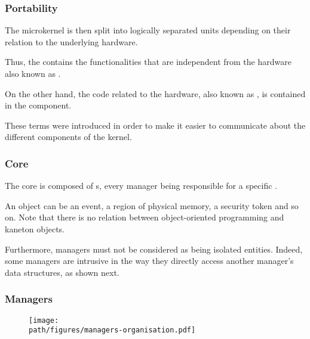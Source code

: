 
\begin{frame}
  \frametitle{Portability}

  The microkernel is then split into logically separated units depending on
  their relation to the underlying hardware.

  \-

  Thus, the  contains the functionalities that are independent
  from the hardware also known as .

  \-

  On the other hand, the code related to the hardware, also known as
  , is contained in the  component.

  \-

  These terms were introduced in order to make it easier to communicate
  about the different components of the kernel.
\end{frame}


\begin{frame}
  \frametitle{Core}

  The core is composed of s, every manager being
  responsible for a specific .

  \-

  An object can be an event, a region of physical memory, a security token
  and so on. Note that there is no relation between object-oriented programming
  and kaneton objects.

  \-

  Furthermore, managers must not be considered as being isolated entities.
  Indeed, some managers are intrusive in the way they directly access another
  manager's data structures, as shown next.
\end{frame}


\begin{frame}
  \frametitle{Managers}

  \begin{figure}[h]
    \begin{center}
      \texttt{[image: \\path/figures/managers-organisation.pdf]}
    \end{center}
  \end{figure}
\end{frame}


